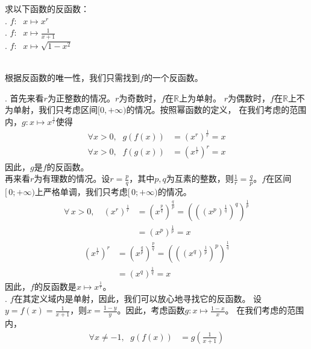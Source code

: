 \documentclass[12pt,UTF8]{ctexbook}
\begin{document}
\begin{et}\label{et:1-3-0}
    求以下函数的反函数：\\
    . $f:\;\,\,x \mapsto x^r$\\
    . $f:\;\,\,x \mapsto \frac{1}{x + 1}$\\
    . $f:\;\,\,x \mapsto \sqrt{1 - x^2}$
\end{et}
\begin{so}
    \mbox{} \\
    根据反函数的唯一性，我们只需找到$f$的一个反函数。

    . 首先来看$r$为正整数的情况。$r$为奇数时，$f$在$\mathbb{R}$上为单射。
    $r$为偶数时，$f$在$\mathbb{R}$上不为单射，我们只考虑区间$[0, +\infty)$的情况。按照幂函数的定义，
    在我们考虑的范围内，$g: x\mapsto x^{\frac{1}{r}}$使得
    \begin{align*}
        \forall x > 0, \;\,\, g(f(x)) &= \left(x^r\right)^{\frac{1}{r}} = x  \\
        \forall x > 0, \;\,\, f(g(x)) &= \left(x^{\frac{1}{r}}\right)^{r} = x  
    \end{align*} 
    因此，$g$是$f$的反函数。\\  
    再来看$r$为有理数的情况。设$r = \frac{p}{q}$，其中$p,q$为互素的整数，则$\frac{1}{r} = \frac{q}{p}$。$f$在区间$[\,0;+\infty)$上严格单调，我们只考虑$[\,0;+\infty)$的情况。
    \begin{align*}
        \forall \, x > 0, \quad \left(x^r\right)^{\frac{1}{r}} &= \left(x^{\frac{p}{q}}\right)^{\frac{q}{p}} = \left(\left(\left(x^{p}\right)^\frac{1}{q}\right)^q\right)^\frac{1}{p}  \\
                                       &= \left(x^{p}\right)^\frac{1}{p} = x 
    \end{align*}
    \begin{align*}
        \left(x^{\frac{1}{r}}\right)^r &= \left(x^{\frac{q}{p}}\right)^{\frac{p}{q}} = \left(\left(\left(x^{q}\right)^\frac{1}{p}\right)^p\right)^\frac{1}{q}  \\
                                       &= \left(x^{q}\right)^\frac{1}{q} = x 
    \end{align*}
    因此，$f$的反函数是$x\mapsto x^{\frac{1}{r}}$。\\
    . $f$在其定义域内是单射，因此，我们可以放心地寻找它的反函数。
    设$y = f(x) = \frac{1}{x+1}$，则$x = \frac{1 - y}{y}$。因此，考虑函数$g: x\mapsto \frac{1 - x}{x}$。
    在我们考虑的范围内，
    \begin{align*}
        \forall x\neq -1, \;\,\, g(f(x)) &= g\left(\frac{1}{x+1}\right)  \\

\end{align*}
\end{so}
\end{document}
